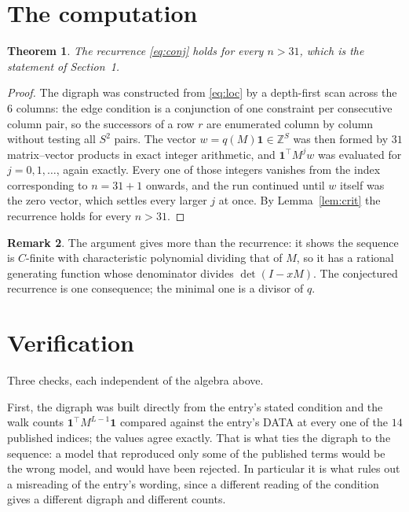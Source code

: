 \documentclass[11pt,a4paper]{article}
\theoremstyle{plain}
\newtheorem{theorem}{Theorem}
\theoremstyle{definition}
\newtheorem{remark}[theorem]{Remark}
\begin{document}
\section{The computation}

\begin{theorem}
The recurrence \eqref{eq:conj} holds for every $n>31$, which is the statement of
Section~1.
\end{theorem}

\begin{proof}
The digraph was constructed from \eqref{eq:loc} by a depth-first scan across the $6$
columns: the edge condition is a conjunction of one constraint per consecutive column
pair, so the successors of a row $r$ are enumerated column by column without testing all
$S^2$ pairs. The vector $w=q(M)\mathbf{1}\in\mathbb{Z}^{S}$ was then formed by $31$
matrix--vector products in exact integer arithmetic, and $\mathbf{1}^{\!\top}M^{j}w$ was
evaluated for $j=0,1,\dots$, again exactly. Every one of those integers vanishes from the
index corresponding to $n=31+1$ onwards, and the run continued until $w$ itself was the
zero vector, which settles every larger $j$ at once. By Lemma~\ref{lem:crit} the recurrence
holds for every $n>31$.
\end{proof}

\begin{remark}
The argument gives more than the recurrence: it shows the sequence is $C$-finite with
characteristic polynomial dividing that of $M$, so it has a rational generating function
whose denominator divides $\det(I-xM)$. The conjectured recurrence is one consequence; the
minimal one is a divisor of $q$.
\end{remark}

\section{Verification}

Three checks, each independent of the algebra above.

First, the digraph was built directly from the entry's stated condition and the walk counts
$\mathbf{1}^{\!\top}M^{L-1}\mathbf{1}$ compared against the entry's DATA at
every one of the $14$ published indices; the values agree exactly. That is what ties
the digraph to the sequence: a model that reproduced only some of the published terms would
be the wrong model, and would have been rejected. In particular it is what rules out a
misreading of the entry's wording, since a different reading of the condition gives a
different digraph and different counts.
\end{document}
